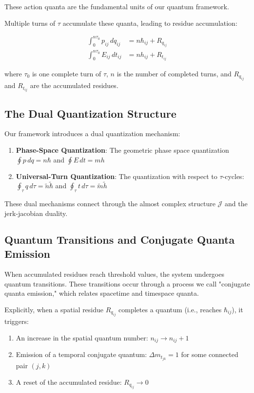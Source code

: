 \documentclass{article}
\begin{document}
These action quanta are the fundamental units of our quantum framework.

Multiple turns of $\tau$ accumulate these quanta, leading to residue accumulation:

\begin{align}
\int_{0}^{n\tau_0} p_{ij} \, dq_{ij} &= n \hbar_{ij} + R_{q_{ij}} \\
\int_{0}^{n\tau_0} E_{ij} \, dt_{ij} &= n h_{ij} + R_{t_{ij}}
\end{align}

where $\tau_0$ is one complete turn of $\tau$, $n$ is the number of completed turns, and $R_{q_{ij}}$ and $R_{t_{ij}}$ are the accumulated residues.

\subsection{The Dual Quantization Structure}

Our framework introduces a dual quantization mechanism:

\begin{enumerate}
\item \textbf{Phase-Space Quantization}: The geometric phase space quantization $\oint p \, dq = n\hbar$ and $\oint E \, dt = mh$
\item \textbf{Universal-Turn Quantization}: The quantization with respect to $\tau$-cycles: $\oint_\tau q \, d\tau = \tilde{n}\tilde{\hbar}$ and $\oint_\tau t \, d\tau = \tilde{m}\tilde{h}$
\end{enumerate}

These dual mechanisms connect through the almost complex structure $\mathcal{J}$ and the jerk-jacobian duality.

\subsection{Quantum Transitions and Conjugate Quanta Emission}

When accumulated residues reach threshold values, the system undergoes quantum transitions. These transitions occur through a process we call "conjugate quanta emission," which relates spacetime and timespace quanta.

Explicitly, when a spatial residue $R_{q_{ij}}$ completes a quantum (i.e., reaches $\hbar_{ij}$), it triggers:
\begin{enumerate}
\item An increase in the spatial quantum number: $n_{ij} \rightarrow n_{ij} + 1$
\item Emission of a temporal conjugate quantum: $\Delta m_{t_{jk}} = 1$ for some connected pair $(j,k)$
\item A reset of the accumulated residue: $R_{q_{ij}} \rightarrow 0$
\end{enumerate}
\end{document}
